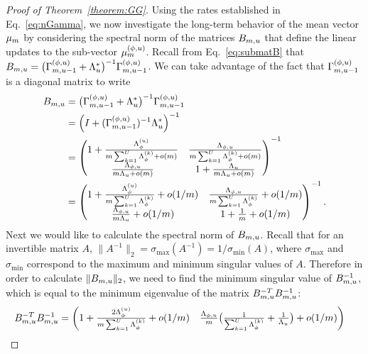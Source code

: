 \documentclass[12pt]{article}\usepackage[]{graphicx}\usepackage[]{xcolor}
\begin{document}
\begin{appendices}
\begin{proof}[Proof of Theorem~\ref{theorem:GG}]
Using the rates established in Eq.~\ref{eq:nGamma}, we now investigate the long-term behavior of the mean vector $\mu_m$ by considering the spectral norm of the matrices $B_{m, u}$ that define the linear updates to the sub-vector $\mu^{(\phi, u)}_{m}$.
Recall from Eq.~\ref{eq:submatB} that $B_{m, u} = \big(\Gamma^{(\phi, u)}_{m, u-1} + \Lambda^*_{u}\big)^{-1}\Gamma^{(\phi, u)}_{m, u-1}$.
We can take advantage of the fact that $\Gamma^{(\phi, u)}_{m, u-1}$ is a diagonal matrix to write
\begin{align*}
  B_{m, u} &= \big(\Gamma^{(\phi, u)}_{m, u-1} + \Lambda^*_{u}\big)^{-1}\Gamma^{(\phi, u)}_{m, u-1} \\
  &= \Big(I + (\Gamma^{(\phi, u)}_{m, u-1})^{-1}\Lambda^*_{u}\Big)^{-1} \\
  &= \begin{pmatrix} 1 + \frac{\Lambda^{(u)}_{\phi}}{m\sum_{k = 1}^U\Lambda^{(k)}_{\phi} + o(m)} & \frac{\Lambda_{\phi, u}}{m\sum_{k = 1}^U\Lambda^{(k)}_{\phi} + o(m)} \\
  \frac{\Lambda_{\phi, u}}{m\Lambda_u + o(m)} & 1 + \frac{\Lambda_{u}}{m\Lambda_u + o(m)} \end{pmatrix}^{-1} \\
  &= \begin{pmatrix} 1 + \frac{\Lambda^{(u)}_{\phi}}{m\sum_{k = 1}^U\Lambda^{(k)}_{\phi}} + o(1/m) & \frac{\Lambda_{\phi, u}}{m\sum_{k = 1}^U\Lambda^{(k)}_{\phi}} + o(1/m)\\
  \frac{\Lambda_{\phi, u}}{m\Lambda_u} + o(1/m) & 1 + \frac{1}{m} + o(1/m) \end{pmatrix}^{-1}.
\end{align*}
Next we would like to calculate the spectral norm of $B_{m, u}$.
Recall that for an invertible matrix $A$, $\|A^{-1}\|_2 = \sigma_{\max}(A^{-1}) = 1 / \sigma_{\min}(A)$, where $\sigma_{\max}$ and $\sigma_{\min}$ correspond to the maximum and minimum singular values of $A$.
Therefore in order to calculate $\|B_{m, u}\|_2$, we need to find the minimum singular value of $B^{-1}_{m, u}$, which is equal to the minimum eigenvalue of the matrix $B^{-T}_{m, u}B^{-1}_{m, u}$:
\begin{align*}
  B^{-T}_{m, u}B^{-1}_{m, u} &= \begin{pmatrix} 1 + \frac{2\Lambda^{(u)}_{\phi}}{m\sum_{k = 1}^U\Lambda^{(k)}_{\phi}} + o(1/m) & \frac{\Lambda_{\phi, u}}{m} \big(\frac{1}{\sum_{k = 1}^U\Lambda^{(k)}_{\phi}} + \frac{1}{\Lambda_u}\big) + o(1/m)\\

\end{pmatrix}
\end{align*}
\end{proof}
\end{appendices}
\end{document}
